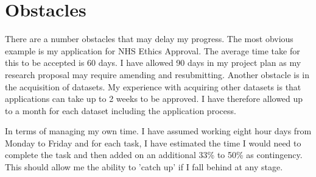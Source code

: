 \documentclass[a4paper]{article}
\begin{document}
\section{Obstacles}
There are a number obstacles that may delay my progress. The most obvious example is my application for NHS Ethics Approval. The average time take for this to be accepted is 60 days. I have allowed 90 days in my project plan as my research proposal may require amending and resubmitting. Another obstacle is in the acquisition of datasets. My experience with acquiring other datasets is that applications can take up to 2 weeks to be approved. I have therefore allowed up to a month for each dataset including the application process. \newline
\par
In terms of managing my own time. I have assumed working eight hour days from Monday to Friday and for each task, I have estimated the time I would need to complete the task and then added on an additional 33\% to 50\% as contingency. This should allow me the ability to 'catch up' if I fall behind at any stage.  
\end{document}
